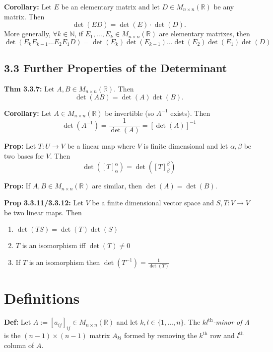 \bigskip 

\noindent 
\textbf{Corollary:} Let $E$ be an elementary matrix and let $D \in M_{n \times n}(\mathbb{R})$ be any matrix. Then 
\[\det(ED) = \det(E) \cdot \det(D).\]
More generally, $\forall k \in \mathbb{N}$, if $E_1, \ldots , E_k \in M_{n \times n}(\mathbb{R})$ are elementary matrixes, then 
\[ \det(E_k E_{k - 1} \ldots E_2 E_1 D) = \det(E_k) \det(E_{k - 1}) \ldots \det(E_2) \det(E_1) \det(D) \]

\pagebreak

\subsection*{3.3 Further Properties of the Determinant}

\textbf{Thm 3.3.7:} Let $A, B \in M_{n \times n}(\mathbb{R})$. Then 
\[\det(AB) = \det(A)\det(B).\]

\bigskip 

\noindent 
\textbf{Corollary:} Let $A \in M_{n \times n}(\mathbb{R})$ be invertible (so $A^{-1}$ exists). Then 
\[\det(A^{-1})=\frac{1}{\det(A)}=[\det(A)]^{-1}\] 

\bigskip 

\noindent 
\textbf{Prop:} Let $T: U \rightarrow V$ be a linear map where $V$ is finite dimensional and let $\alpha, \beta$ be two bases for $V$. Then 
\[\det([T]_\alpha^\alpha)=\det([T]_\beta^\beta)\]

\bigskip 

\noindent 
\textbf{Prop:} If $A, B \in M_{n \times n}(\mathbb{R})$ are similar, then $\det(A) = \det(B)$.

\bigskip 

\noindent 
\textbf{Prop 3.3.11/3.3.12:} Let $V$ be a finite dimensional vector space and $S,T:V \rightarrow V$ be two linear maps. Then 
\begin{enumerate}
    \item $\det(TS)=\det(T)\det(S)$   
    \item $T$ is an isomorphism iff $\det(T) \ne 0$ 
    \item If $T$ is an isomorphism then $\det(T^{-1}) = \frac{1}{\det(T)}$ 
\end{enumerate}

\pagebreak

\section*{Definitions}

\textbf{Def:} Let $A := [a_{ij}]_{ij} \in M_{n \times n}(\mathbb{R})$ and let $k, l \in \{1, \ldots , n \}$. The $kl^\text{th}$\textit{-minor of A} is the $(n - 1) \times (n - 1)$ matrix $A_{kl}$ formed by removing the $k^\text{th}$ row and $l^\text{th}$ column of $A$.

